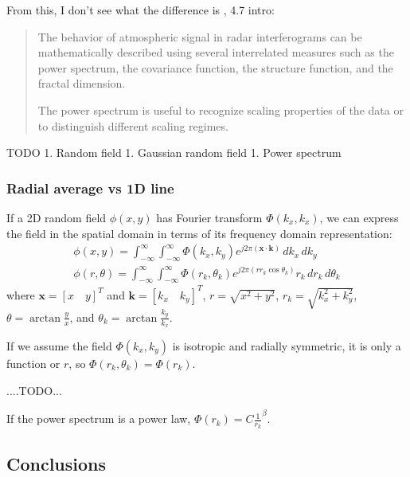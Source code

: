 \documentclass{utexasthesis}
\begin{document}
From \cite{Hanssen2001} this, I don't see \citet{Hanssen2001} what the difference is \citep{Hanssen2001} , 4.7 intro: 

\begin{quote}
    
The behavior of atmospheric signal in radar interferograms can be mathematically described using several interrelated measures such as the power spectrum, the covariance function, the structure function, and the fractal dimension.

The power spectrum is useful to recognize scaling properties of the data or to distinguish different scaling regimes.
\end{quote}

TODO 1. Random field 1. Gaussian random field 1. Power spectrum


\subsubsection{Radial average vs 1D line}

If a 2D random field $\phi(x, y)$ has Fourier transform $\Phi(k_x, k_x)$, we can express the field in the spatial domain in terms of its frequency domain representation:
\begin{gather}
    \phi(x, y) =  \int_{-\infty}^{\infty} \int_{-\infty}^{\infty} \Phi(k_x, k_y) e ^{j 2 \pi (\bm{x} \cdot \bm{k}) } \, d k_x \,d k_y \\
   \phi(r, \theta) = \int_{-\infty}^{\infty} \int_{-\infty}^{\infty} \Phi(r_k, \theta_k) e ^{j 2 \pi (r r_k \cos \theta_k ) } r_k \, d r_k \,d \theta_k
\end{gather}
where $\bm{x} = [x \quad y]^T$ and $\bm{k} = [k_x \quad k_y]^T$, $r = \sqrt{x^2 + y^2}$,  $r_k = \sqrt{k_x^2 + k_y^2}$, $\theta = \arctan \frac{y}{x}$, and $\theta_k = \arctan \frac{k_y}{k_x}$.

If we assume the field $\Phi(k_x, k_y)$ is isotropic and radially symmetric, it is only a function or $r$, so $\Phi(r_k, \theta_k) = \Phi(r_k) $.

....TODO...

If the power spectrum is a power law, $\Phi(r_k) = C \frac{1}{r_k}^\beta$. 



\subsection{Conclusions}
\end{document}
